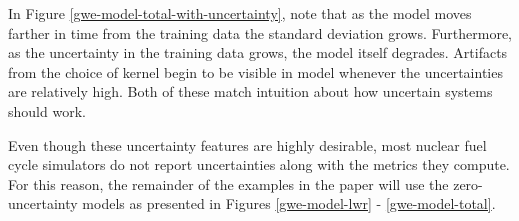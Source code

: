In Figure \ref{gwe-model-total-with-uncertainty}, note that as the model moves 
farther in time from the training data the standard deviation grows. Furthermore, 
as the uncertainty in the training data grows, the model itself degrades. Artifacts
from the choice of kernel begin to be visible in model whenever the uncertainties are 
relatively high. Both of these match intuition about how uncertain systems should
work.

Even though these uncertainty features are highly desirable, most nuclear fuel
cycle simulators do not report uncertainties along with the metrics they compute.
For this reason, the remainder of the examples in the paper will use the 
zero-uncertainty models as presented in Figures \ref{gwe-model-lwr} - 
\ref{gwe-model-total}.


